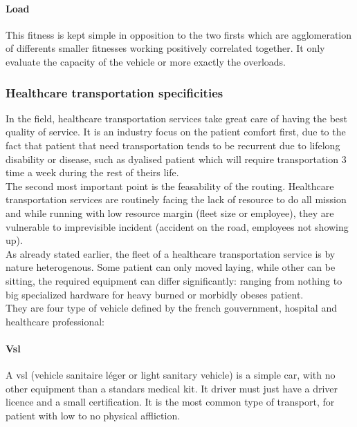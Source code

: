\documentclass[12pt]{memoir}
\begin{document}
\paragraph{Load} %
This fitness is kept simple in opposition to the two firsts which are agglomeration
of differents smaller fitnesses working positively correlated together. It only
evaluate the capacity of the vehicle or more exactly the overloads.
\label{par:Load}


\subsubsection{Healthcare transportation specificities}
\label{sub:Healthcare transportation specificities}
In the field, healthcare transportation services take great care of having the best
quality of service. It is an industry focus on the patient comfort first, due to the
fact that patient that need transportation tends to be recurrent due to lifelong
disability or disease, such as dyalised patient which will require transportation 3
time a week during the rest of theirs life. \\
The second most important point is the feasability of the routing. Healthcare
transportation services are routinely facing the lack of resource to do all mission
and while running with low resource margin (fleet size or employee), they are
vulnerable to imprevisible incident (accident on the road, employees not showing
up).\\

As already stated earlier, the fleet of a healthcare transportation service is by
nature heterogenous. Some patient can only moved laying, while other can be sitting,
the required equipment can differ significantly: ranging from nothing to big specialized
hardware for heavy burned or morbidly obeses patient.\\
They are four type of vehicle defined by the french gouvernment, hospital and healthcare professional:

\paragraph{Vsl} %
\label{par:VSL}
A vsl (vehicle sanitaire léger or light sanitary vehicle) is a simple car, with no
other equipment than a standars medical kit. It driver must just have a driver
licence and a small certification. It is the most common type of transport, for
patient with low to no physical affliction.
\end{document}
